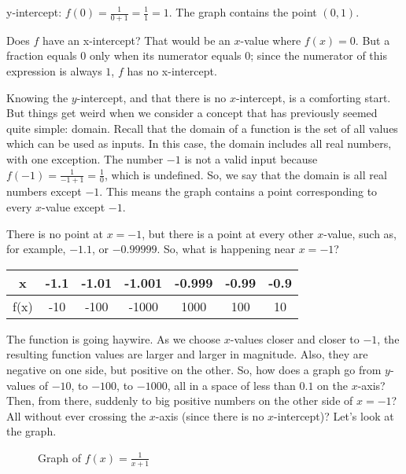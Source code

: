 y-intercept: \( f(0) = \frac{1}{0 + 1} = \frac{1}{1} = 1 \). The graph contains the point \( (0, 1) \).

Does \( f \) have an x-intercept? That would be an \( x \)-value where \( f(x) = 0 \). But a fraction equals \( 0 \) only when its numerator equals \( 0 \); since the numerator of this expression is always \( 1 \), \( f \) has no x-intercept. 

Knowing the \( y \)-intercept, and that there is no \( x \)-intercept, is a comforting start. But things get weird when we consider a concept that has previously seemed quite simple: domain. Recall that the domain of a function is the set of all values which can be used as inputs. In this case, the domain includes all real numbers, with one exception. The number \( -1 \) is not a valid input because \( f(-1) = \frac{1}{-1+1} = \frac{1}{0} \), which is undefined. So, we say that the domain is all real numbers except \( -1 \). This means the graph contains a point corresponding to every \( x \)-value except \( -1 \).

There is no point at \( x = -1 \), but there is a point at every other \( x \)-value, such as, for example, \( -1.1 \), or \( -0.99999 \). So, what is happening near \( x = -1 \)?

\begin{center}
\begin{tabular}{ |c|c|c|c|c|c|c| } 
 \hline
 x & -1.1 & -1.01 & -1.001 & -0.999 & -0.99 & -0.9 \\ 
 \hline
 f(x) & -10 & -100 & -1000 & 1000 & 100 & 10 \\ 
 \hline
\end{tabular}
\end{center}

The function is going haywire. As we choose \( x \)-values closer and closer to \( -1 \), the resulting function values are larger and larger in magnitude. Also, they are negative on one side, but positive on the other. So, how does a graph go from \( y \)-values of \( -10 \), to \( -100 \), to \( -1000 \), all in a space of less than \( 0.1 \) on the \( x \)-axis? Then, from there, suddenly to big positive numbers on the other side of \( x = -1 \)? All without ever crossing the \( x \)-axis (since there is no \( x \)-intercept)? Let's look at the graph.

\begin{figure}[htbp]
  \centering
  \caption{Graph of \( f(x) = \frac{1}{x+1} \)}
\end{figure}

